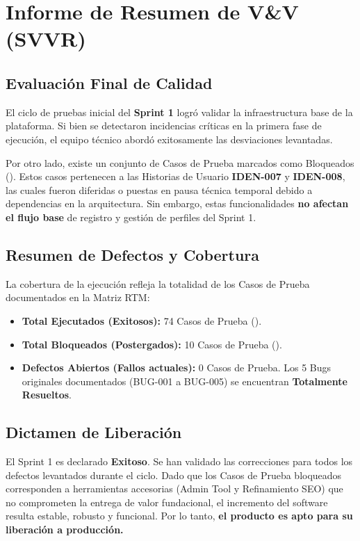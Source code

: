 \section{Informe de Resumen de V\&V (SVVR)}
\label{sec:svvr}

\subsection{Evaluación Final de Calidad}
El ciclo de pruebas inicial del \textbf{Sprint 1} logró validar la infraestructura base de la plataforma. Si bien se detectaron incidencias críticas en la primera fase de ejecución, el equipo técnico abordó exitosamente las desviaciones levantadas. 

Por otro lado, existe un conjunto de Casos de Prueba marcados como Bloqueados (\estadoBlocked). Estos casos pertenecen a las Historias de Usuario \textbf{IDEN-007} y \textbf{IDEN-008}, las cuales fueron diferidas o puestas en pausa técnica temporal debido a dependencias en la arquitectura. Sin embargo, estas funcionalidades \textbf{no afectan el flujo base} de registro y gestión de perfiles del Sprint 1.

\subsection{Resumen de Defectos y Cobertura}
La cobertura de la ejecución refleja la totalidad de los Casos de Prueba documentados en la Matriz RTM:

\begin{itemize}[noitemsep]
    \item \textbf{Total Ejecutados (Exitosos):} 74 Casos de Prueba (\estadoPass).
    \item \textbf{Total Bloqueados (Postergados):} 10 Casos de Prueba (\estadoBlocked).
    \item \textbf{Defectos Abiertos (Fallos actuales):} 0 Casos de Prueba. Los 5 Bugs originales documentados (BUG-001 a BUG-005) se encuentran \textbf{Totalmente Resueltos}.
\end{itemize}

\subsection{Dictamen de Liberación}
\begin{tcolorbox}[colback=white, colframe=bgPass, boxrule=1.2pt, arc=2pt, title={\faCheckCircle\ \textbf{DICTAMEN: SPRINT EXITOSO Y APROBADO}}, coltitle=bgPass, fonttitle=\sffamily, attach title to upper=\par\vspace{0.2em}]
\sffamily
El Sprint 1 es declarado \textbf{Exitoso}. Se han validado las correcciones para todos los defectos levantados durante el ciclo. Dado que los Casos de Prueba bloqueados corresponden a herramientas accesorias (Admin Tool y Refinamiento SEO) que no comprometen la entrega de valor fundacional, el incremento del software resulta estable, robusto y funcional. Por lo tanto, \textbf{el producto es apto para su liberación a producción.}
\end{tcolorbox}

